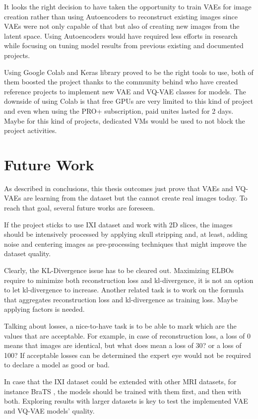 It looks the right decision to have taken the opportunity to train VAEs for image creation rather than using Autoencoders to reconstruct existing images since VAEs were not only capable of that but also of creating new images from the latent space. Using Autoencoders would have required less efforts in research while focusing on tuning model results from previous existing and documented projects.

Using Google Colab and Keras library proved to be the right tools to use, both of them boosted the project thanks to the community behind who have created reference projects to implement new VAE and VQ-VAE classes for models. The downside of using Colab is that free GPUs are very limited to this kind of project and even when using the PRO+ subscription, paid unites lasted for 2 days. Maybe for this kind of projects, dedicated VMs would be used to not block the project activities.

\section{Future Work}

As described in conclusions, this thesis outcomes just prove that VAEs and VQ-VAEs are learning from the dataset but the cannot create real images today. To reach that goal, several future works are foreseen.

If the project sticks to use IXI dataset and work with 2D slices, the images should be intensively processed by applying skull stripping and, at least, adding noise and centering images as pre-processing techniques that might improve the dataset quality.

Clearly, the KL-Divergence issue has to be cleared out. Maximizing ELBOs require to minimize both reconstruction loss and kl-divergence, it is not an option to let kl-divergence to increase. Another related task is to work on the formula that aggregates reconstruction loss and kl-divergence as training loss. Maybe applying factors is needed. 

Talking about losses, a nice-to-have task is to be able to mark which are the values that are acceptable. For example, in case of reconstruction loss, a loss of 0 means that images are identical, but what does mean a loss of 30? or a loss of 100? If acceptable losses can be determined the expert eye would not be required to declare a model as good or bad.

In case that the IXI dataset could be extended with other MRI datasets, for instance BraTS \cite{brats}, the models should be trained with them first, and then with both. Exploring results with larger datasets is key to test the implemented VAE and VQ-VAE models' quality.